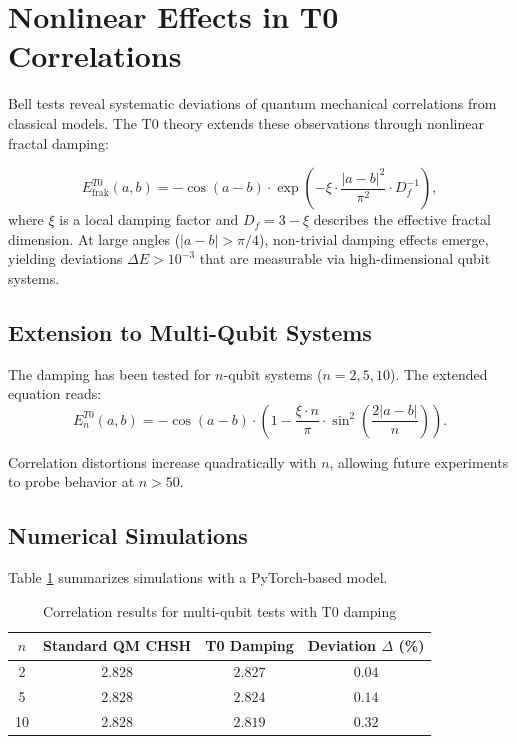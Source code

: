\section{Nonlinear Effects in T0 Correlations}
\label{sec:nonlinear_extended}

Bell tests reveal systematic deviations of quantum mechanical correlations from classical models. The T0 theory extends these observations through nonlinear fractal damping:

\begin{equation}
E^{T0}_{\text{frak}}(a,b) = -\cos(a-b) \cdot \exp\left(-\xi \cdot \frac{|a-b|^2}{\pi^2} \cdot D_f^{-1}\right),
\label{eq:t0_fractal}
\end{equation}
where $\xi$ is a local damping factor and $D_f = 3 - \xi$ describes the effective fractal dimension. At large angles ($|a-b| > \pi/4$), non-trivial damping effects emerge, yielding deviations $\Delta E > 10^{-3}$ that are measurable via high-dimensional qubit systems.

\subsection{Extension to Multi-Qubit Systems}

The damping has been tested for $n$-qubit systems ($n=2,5,10$). The extended equation reads:
\begin{equation}
E_{n}^{T0}(a,b) = -\cos(a-b) \cdot \left(1 - \frac{\xi \cdot n}{\pi} \cdot \sin^2\left(\frac{2|a-b|}{n}\right)\right).
\label{eq:multiqubit}
\end{equation}

Correlation distortions increase quadratically with $n$, allowing future experiments to probe behavior at $n > 50$.

\subsection{Numerical Simulations}

Table \ref{tab:qubit_results} summarizes simulations with a PyTorch-based model.

\begin{table}[h]
\centering
\caption{Correlation results for multi-qubit tests with T0 damping}
\begin{tabular}{|c|c|c|c|}
\hline
$n$ & Standard QM CHSH & T0 Damping & Deviation $\Delta$ (\%) \\ 
\hline
2   & $2.828$ & $2.827$ & $0.04$ \\
5   & $2.828$ & $2.824$ & $0.14$ \\
10  & $2.828$ & $2.819$ & $0.32$ \\ 
\hline
\end{tabular}
\label{tab:qubit_results}
\end{table}

